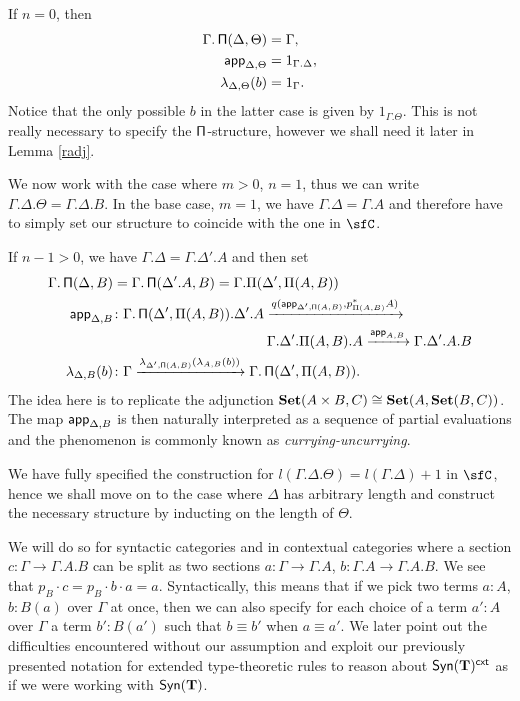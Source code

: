 \begin{construction}[Part 1]
  If $n=0$, then
  \begin{align*}
    \Gamma.\operatorname{\mathsf{\Pi}}(\Delta,\Theta) &=\Gamma, \\
    \operatorname{\mathsf{app}}_{\Delta,\Theta} &=1_{\Gamma.\Delta}, \\
    \lambda_{\Delta,\Theta}(b) &=1_\Gamma.
  \end{align*}
  Notice that the only possible $b$ in the latter case is given by
  $1_{\Gamma.\Theta}$. This is not really necessary to specify the
  $\operatorname{\mathsf{\Pi}}$-structure, however we shall need it later in Lemma \ref{radj}.

  We now work with the case where $m>0$, $n=1$, thus we can write
  $\Gamma.\Delta.\Theta=\Gamma.\Delta.B$. In the base case, $m=1$, we have
  $\Gamma.\Delta=\Gamma.A$ and therefore have to simply set our structure to
  coincide with the one in $\sfC$.

  If $n-1>0$, we have
  $\Gamma.\Delta=\Gamma.\Delta'.A$ and then set
  \begin{align*}
    \Gamma.\operatorname{\mathsf{\Pi}}(\Delta,B)
    &=\Gamma.\operatorname{\mathsf{\Pi}}(\Delta'.A,B)=\Gamma.\Pi(\Delta',\Pi(A,B)) \\
    \operatorname{\mathsf{app}}_{\Delta,B} 
    &\colon
    \Gamma.\operatorname{\mathsf{\Pi}}(\Delta',\Pi(A,B)).\Delta'.A
                    \xrightarrow{q(\operatorname{\mathsf{app}}_{\Delta',\operatorname{\mathsf{\Pi}}(A,B)},p^*_{\Pi(A,B)}A)} \\
    &\quad\quad\quad\quad\quad\quad\quad\quad\quad\quad\quad
    \Gamma.\Delta'.\Pi(A,B).A
    \xrightarrow{\operatorname{\mathsf{app}}_{A,B}}
    \Gamma.\Delta'.A.B \\
    \lambda_{\Delta,B}(b)
    &\colon
    \Gamma
    \xrightarrow{\lambda_{\Delta',\operatorname{\mathsf{\Pi}}(A,B)}(\lambda_{A,B}(b))}
    \Gamma.\operatorname{\mathsf{\Pi}}(\Delta',\Pi(A,B)).
  \end{align*}
  The idea here is to replicate the adjunction $\operatorname{\mathbf{Set}}(A\times
  B,C)\cong\operatorname{\mathbf{Set}}(A,\operatorname{\mathbf{Set}}(B,C))$. The map $\operatorname{\mathsf{app}}_{\Delta,B}$ is then naturally
  interpreted as a sequence of partial evaluations and the phenomenon is
  commonly known as \emph{currying-uncurrying}.

\end{construction}

  We have fully specified the construction for
  $l(\Gamma.\Delta.\Theta)=l(\Gamma.\Delta)+1$ in $\sfC$, hence we shall move on
  to the case where $\Delta$ has arbitrary length and construct the necessary
  structure by inducting on the length of $\Theta$.

We will do so for syntactic categories and in contextual categories where a
section $c\colon\Gamma\rightarrow\Gamma.A.B$ can be split as
two sections $a\colon\Gamma\rightarrow\Gamma.A$,
$b\colon\Gamma.A\rightarrow\Gamma.A.B$.
We see that $p_B\cdot c=p_B\cdot b\cdot a=a$. Syntactically, this means that if
we pick two terms $a:A$, $b:B(a)$ over $\Gamma$ at once, then we can also
specify for each choice of a term $a':A$ over $\Gamma$ a term $b':B(a')$ such
that $b\equiv b'$ when $a\equiv a'$. We later point out the
difficulties encountered without our assumption and exploit our previously
presented notation for extended type-theoretic rules to reason about
$\mathsf{Syn}(\mathbf{T})^{\operatorname{\mathsf{cxt}}}$ as if we were working with $\mathsf{Syn}(\mathbf{T})$.

